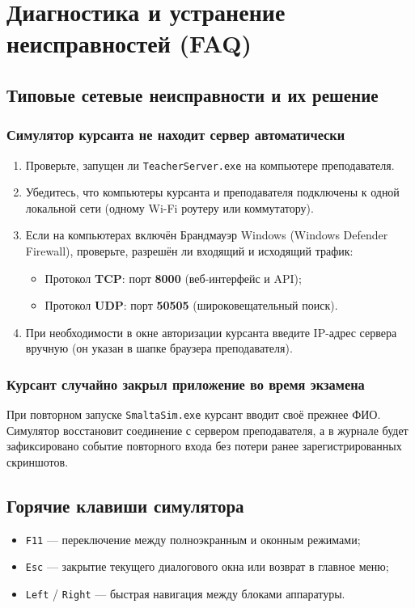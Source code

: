\documentclass[12pt,a4paper]{report}
\begin{document}
\chapter{Диагностика и устранение неисправностей (FAQ)}

\section{Типовые сетевые неисправности и их решение}

\subsection{Симулятор курсанта не находит сервер автоматически}
\begin{enumerate}
    \item Проверьте, запущен ли \texttt{TeacherServer.exe} на компьютере преподавателя.
    \item Убедитесь, что компьютеры курсанта и преподавателя подключены к одной локальной сети (одному Wi-Fi роутеру или коммутатору).
    \item Если на компьютерах включён Брандмауэр Windows (Windows Defender Firewall), проверьте, разрешён ли входящий и исходящий трафик:
    \begin{itemize}
        \item Протокол \textbf{TCP}: порт \textbf{8000} (веб-интерфейс и API);
        \item Протокол \textbf{UDP}: порт \textbf{50505} (широковещательный поиск).
    \end{itemize}
    \item При необходимости в окне авторизации курсанта введите IP-адрес сервера вручную (он указан в шапке браузера преподавателя).
\end{enumerate}

\subsection{Курсант случайно закрыл приложение во время экзамена}
При повторном запуске \texttt{SmaltaSim.exe} курсант вводит своё прежнее ФИО. Симулятор восстановит соединение с сервером преподавателя, а в журнале будет зафиксировано событие повторного входа без потери ранее зарегистрированных скриншотов.

\section{Горячие клавиши симулятора}
\begin{itemize}
    \item \texttt{F11} --- переключение между полноэкранным и оконным режимами;
    \item \texttt{Esc} --- закрытие текущего диалогового окна или возврат в главное меню;
    \item \texttt{Left} / \texttt{Right} --- быстрая навигация между блоками аппаратуры.
\end{itemize}
\end{document}

